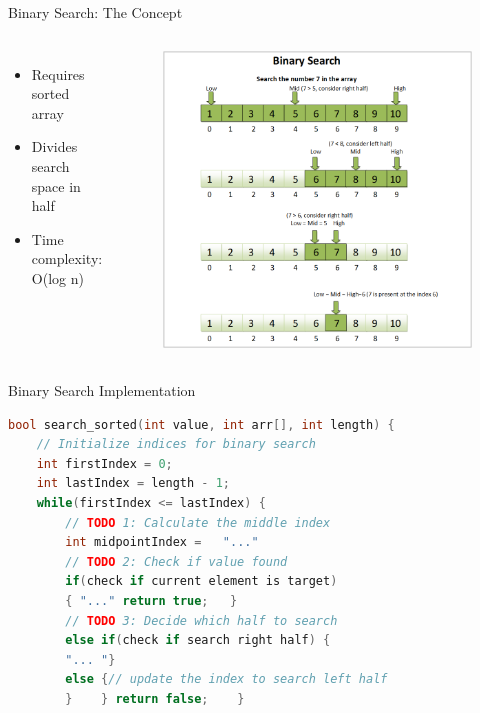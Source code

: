 \documentclass{beamer}
\begin{document}
\begin{frame}{Binary Search: The Concept}
\begin{columns}
\begin{itemize}
\item Requires sorted array
\item Divides search space in half
\item Time complexity: O(log n)
\end{itemize}

\begin{figure}
    \centering
    \includegraphics[width=1\linewidth]{../images/cs12-arrays-search_visualization.png}
\end{figure}
\end{columns}
\end{frame}

\begin{frame}[fragile]{Binary Search Implementation}
\begin{lstlisting}[language=C++]
bool search_sorted(int value, int arr[], int length) {
    // Initialize indices for binary search
    int firstIndex = 0;
    int lastIndex = length - 1;    
    while(firstIndex <= lastIndex) {
        // TODO 1: Calculate the middle index
        int midpointIndex =   "..."      
        // TODO 2: Check if value found
        if(check if current element is target) 
        { "..." return true;   }
        // TODO 3: Decide which half to search
        else if(check if search right half) {
        "... "}
        else {// update the index to search left half
        }    } return false;    }
\end{lstlisting}
\end{frame}
\end{document}

